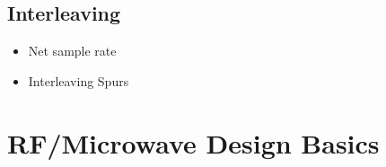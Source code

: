 \cite{walt}
\subsection{Interleaving}

\begin{itemize}
\item Net sample rate
\item Interleaving Spurs
\end{itemize}

\cite{mangrob}



\newpage
\section{RF/Microwave Design Basics}